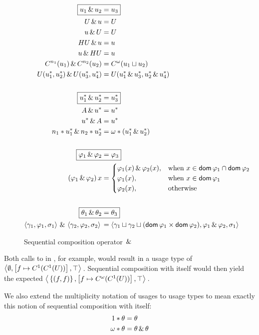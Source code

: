 \begin{figure}
\begin{alignat*}{1}
  \Aboxed{u_1 \both u_2 &= u_3} \\
  U \both u  &= U \\
  u \both U  &= U \\
  HU \both u &= u \\
  u \both HU &= u \\
  C^{n_1}(u_1) \both C^{n_2}(u_2) &= C^{\omega}(u_1 \llub u_2) \\
  U(u^*_1, u^*_2) \both U(u^*_3, u^*_4) &= U(u^*_1 \both u^*_3, u^*_2 \both u^*_4) \\
  &\\
  \Aboxed{u^*_1 \both u^*_2 &= u^*_3} \\
  A \both u^* &= u^* \\
  u^* \both A &= u^* \\ 
  n_1*u^*_1 \both n_2*u^*_2 &= \omega * (u^*_1 \both u^*_2) \\
  &\\
  \Aboxed{\varphi_1 \both \varphi_2 &= \varphi_3} \\
  (\varphi_1 \both \varphi_2)\,x &= \begin{cases}
    \varphi_1(x) \both \varphi_2(x),&\text{when } x \in \dom{\varphi_1} \cap \dom{\varphi_2} \\
    \varphi_1(x),&\text{when } x \in \dom{\varphi_1} \\
    \varphi_2(x),&\text{otherwise}
  \end{cases} \\
  &\\
  \Aboxed{\theta_1 \both \theta_2 &= \theta_3} \\
  \lTriple{\gamma_1}{\varphi_1}{\sigma_1} \both \lTriple{\gamma_2}{\varphi_2}{\sigma_2} &= \lTriple{\gamma_1 \llub \gamma_2 \llub (\dom{\varphi_1} \times \dom{\varphi_2})}{\varphi_1 \both \varphi_2}{\sigma_1} \\
\end{alignat*}
\caption{Sequential composition operator $\,\&\,$}
\label{fig:both}
\end{figure}

Both calls to  in , for example, would result in a usage type of $\left\langle{}\emptyset,\left[f\mapsto C^1(C^1(U))\right],\top\right\rangle{}$. 
Sequential composition with itself would then yield the expected $\left\langle{}\left\{(f,f)\right\},\left[f\mapsto C^\omega(C^1(U))\right],\top\right\rangle{}$.

We also extend the multiplicity notation of usages to usage types to mean exactly this notion of sequential composition with itself:
\begin{alignat*}{1}
  1 * \theta &= \theta \\
  \omega * \theta &= \theta \,\&\, \theta
\end{alignat*}

